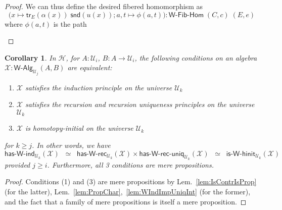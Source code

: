\documentclass[reqno,10pt,a4paper,oneside]{amsart}
\newcommand{\X}{\mathcal{X}}
\newcommand{\fst}{\mathsf{fst}}
\newcommand{\snd}{\mathsf{snd}}
\newcommand{\lam}[1]{\lambda_{#1}}
\newcommand{\refl}{\mathsf{refl}}
\newcommand{\W}{\mathsf{W}}
\newcommand{\funext}{\leftidx{^\Pi}{\mathsf{Eq}}^{=}}
\newcommand{\happly}{\leftidx{^=}{\mathsf{Eq}}^{\Pi}}
\newcommand{\idtodpair}{\leftidx{^=}{\mathsf{Eq}}^{\Sigma}}
\newcommand{\UU}{\mathcal{U}}
\newcommand{\WAlg}{\mathsf{W}\text{-}\mathsf{Alg}}
\newcommand{\WFibHom}{\mathsf{W}\text{-}\mathsf{Fib}\text{-}\mathsf{Hom}}
\newcommand{\HasWRec}{\mathsf{has}\text{-}\mathsf{W}\text{-}\mathsf{rec}}
\newcommand{\HasWInd}{\mathsf{has}\text{-}\mathsf{W}\text{-}\mathsf{ind}}
\newcommand{\HasWRecUniq}{\mathsf{has}\text{-}\mathsf{W}\text{-}\mathsf{rec}\text{-}\mathsf{uniq}}
\newcommand{\IsWHInit}{\mathsf{is}\text{-}\mathsf{\W}\text{-}\mathsf{hinit}}
\newcommand{\app}{\mathsf{ap}}
\newcommand{\trans}{\mathsf{tr}}
\newcommand{\Hint}{\mathcal{H}}
\newcommand{\ct}{%
  \mathchoice{\mathbin{\raisebox{0.5ex}{$\displaystyle\centerdot$}}}%
             {\mathbin{\raisebox{0.5ex}{$\centerdot$}}}%
             {\mathbin{\raisebox{0.25ex}{$\scriptstyle\,\centerdot\,$}}}%
             {\mathbin{\raisebox{0.1ex}{$\scriptscriptstyle\,\centerdot\,$}}}}
\numberwithin{equation}{section}
\theoremstyle{mythm}
\newtheorem{corollary}[theorem]{Corollary}
\theoremstyle{mydef}
\theoremstyle{myrmk}
\begin{document}
\begin{proof}
We can thus define the desired fibered homomorphism as \[\Big(x \mapsto \trans_E(\alpha(x)) \; \snd(u(x)); a,t \mapsto \phi(a,t) \Big) : \WFibHom \; (C,c) \; (E,e)\]
where $\phi(a,t)$ is the path
\begin{center}
\end{center}
\end{proof}

\begin{corollary}\label{lem:WMainInt}
In $\Hint$, for $A:\UU_i$, $B : A \to \UU_i$, the following conditions on an algebra $\X : \WAlg_{\UU_j}(A,B)$ are equivalent:
\begin{enumerate}
\item $\X$ satisfies the induction principle on the universe $\UU_k$
\item $\X$ satisfies the recursion and recursion uniqueness principles on the universe $\UU_k$
\item $\X$ is homotopy-initial on the universe $\UU_k$  
\end{enumerate}
for $k \geq j$. In other words, we have \[ \HasWInd_{\UU_k}(\X)  \;\; \simeq \;\; \HasWRec_{\UU_k}(\X) \times \HasWRecUniq_{\UU_k}(\X) \;\; \simeq \;\; \IsWHInit_{\UU_k}(\X) \]
provided $j \geq i$. Furthermore, all 3 conditions are mere propositions.
\end{corollary}
\begin{proof}
Conditions (1) and (3) are mere propositions by Lem.~\ref{lem:IsContrIsProp} (for the latter), Lem.~\ref{lem:PropChar},~\ref{lem:WIndImpUniqInt} (for the former), and the fact that a family of mere propositions is itself a mere proposition.
\end{proof}
\end{document}
